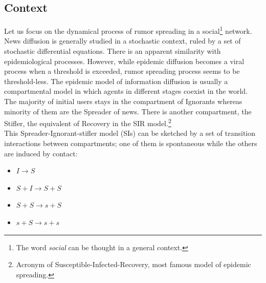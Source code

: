 \subsection{Context}
Let us focus on the dynamical process of rumor spreading in a social\footnote{The word \textit{social} can be thought in a general context.} network.
\\ News diffusion is generally studied in a stochastic context, ruled by a set of stochastic differential equations.
 There is an apparent similarity with epidemiological processes. 
However, while epidemic diffusion becomes a viral process when a threshold is exceeded, rumor spreading process seems to be threshold-less.
 The epidemic model of information diffusion is usually a compartmental model in which agents in different stages coexist in the world.
The majority of initial users stays in the compartment of Ignorants whereas minority of them are the Spreader of news.
 There is another compartment, the Stifler, the equivalent of Recovery in the SIR model.\footnote{Acronym of Susceptible-Infected-Recovery, most famous model of epidemic spreading.}
\\ This Spreader-Ignorant-stifler model (SIs) can be sketched by a set of transition interactions between compartments; one of them is spontaneous while the others are induced by contact:
\begin{itemize}
\item$ I \longrightarrow S$
\item $S+I \longrightarrow S + S$

\item $S + S \longrightarrow s + S$

\item $s + S \longrightarrow  s + s$
\end{itemize}

